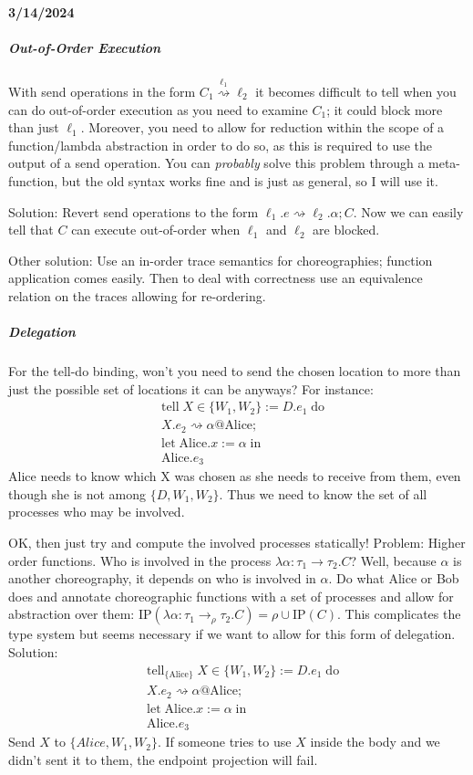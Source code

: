 \documentclass{article}
\theoremstyle{definition}
\begin{document}
\paragraph{3/14/2024}
\subparagraph{Out-of-Order Execution}
With send operations in the form $C_1 \overset{\ell_1}{\rightsquigarrow} \ell_2$ it becomes difficult to tell when you can do out-of-order execution as you need to examine $C_1$; it could block more than just $\ell_1$. Moreover, you need to allow for reduction within the scope of a function/lambda abstraction in order to do so, as this is required to use the output of a send operation. You can \emph{probably} solve this problem through a meta-function, but the old syntax works fine and is just as general, so I will use it.

Solution: Revert send operations to the form $\ell_1.e \rightsquigarrow \ell_2.\alpha; C$. Now we can easily tell that $C$ can execute out-of-order when $\ell_1$ and $\ell_2$ are blocked.

Other solution: Use an in-order trace semantics for choreographies; function application comes easily. Then to deal with correctness use an equivalence relation on the traces allowing for re-ordering.

\subparagraph{Delegation}
For the tell-do binding, won't you need to send the chosen location to more than just the possible set of locations it can be anyways? For instance:
\begin{align*}
	&\text{tell}\; X \in \{W_1,W_2\} := D.e_1 \;\text{do}\\
	&X.e_2 \rightsquigarrow \alpha @ \text{Alice};\\
	&\text{let}\; \text{Alice}.x := \alpha \;\text{in}\\
	&\text{Alice}.e_3
\end{align*}
Alice needs to know which X was chosen as she needs to receive from them, even though she is not among $\{D,W_1,W_2\}$. Thus we need to know the set of all processes who may be involved.

OK, then just try and compute the involved processes statically! Problem: Higher order functions. Who is involved in the process $\lambda \alpha : \tau_1 \rightarrow \tau_2.C$? Well, because $\alpha$ is another choreography, it depends on who is involved in $\alpha$. Do what Alice or Bob does and annotate choreographic functions with a set of processes and allow for abstraction over them: $\text{IP}(\lambda \alpha : \tau_1 \rightarrow_\rho \tau_2.C) = \rho \cup \text{IP}(C)$. This complicates the type system but seems necessary if we want to allow for this form of delegation.
Solution:
\begin{align*}
	&\text{tell}_{\{\text{Alice}\}}\; X \in \{W_1,W_2\} := D.e_1 \;\text{do}\\
	&X.e_2 \rightsquigarrow \alpha @ \text{Alice};\\
	&\text{let}\; \text{Alice}.x := \alpha \;\text{in}\\
	&\text{Alice}.e_3
\end{align*}
Send $X$ to $\{Alice, W_1, W_2\}$. If someone tries to use $X$ inside the body and we didn't sent it to them, the endpoint projection will fail.
\end{document}
